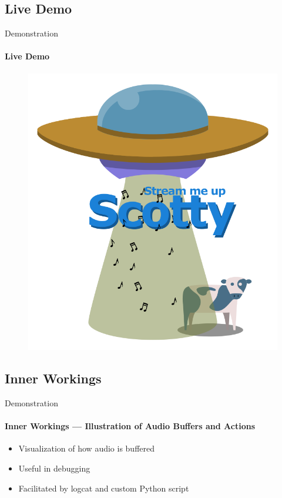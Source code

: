 \subsection{Live Demo}
\begin{frame}{Demonstration}
    \framesubtitle{Live Demo}
    \begin{figure}
    \centering
    \includegraphics[height=0.7\textheight]{images/scotty_white.png}
    \end{figure}
\end{frame}

\subsection{Inner Workings}

\begin{frame}{Demonstration}
    \framesubtitle{Inner Workings --- Illustration of Audio Buffers and Actions}
    \begin{itemize}
        \item Visualization of how audio is buffered
        \item Useful in debugging
        \item Facilitated by logcat and custom Python script
    \end{itemize}
\end{frame}

